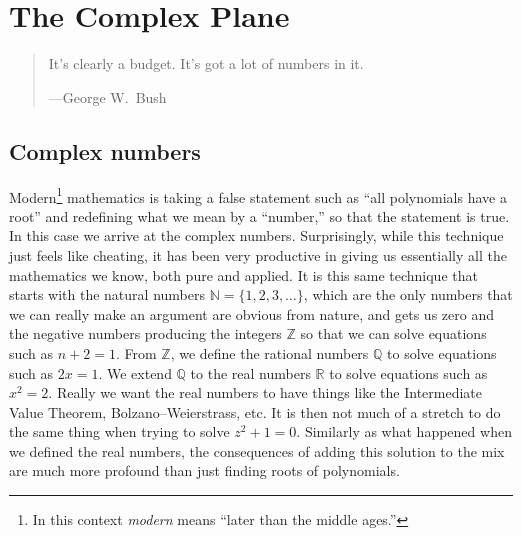 \documentclass[12pt,openany]{book}
\newcommand{\R}{{\mathbb{R}}}
\newcommand{\Z}{{\mathbb{Z}}}
\newcommand{\N}{{\mathbb{N}}}
\newcommand{\Q}{{\mathbb{Q}}}
\theoremstyle{plain}
\theoremstyle{remark}
\theoremstyle{definition}
\newenvironment{myquote}{%
    \begin{quote}%
    \begingroup\itshape
}{%
    \endgroup%
    \end{quote}
}
\theoremstyle{exercise}
\theoremstyle{example}
\begin{document}

\chapter{The Complex Plane} \label{ch:complexplane}

\begin{myquote}
It's clearly a budget. It's got a lot of numbers in it.

---George W.\ Bush
\end{myquote}


\section{Complex numbers} \label{sec:complexnums}


Modern\footnote{In this context \emph{modern}
means ``later than the middle ages.''}
mathematics
is taking a false statement such as ``all
polynomials have a root'' and redefining what we mean by a ``number,''
so that the statement is true.  In this case we arrive at the complex
numbers.  Surprisingly, while this technique
just feels like cheating, it has been very productive in giving us
essentially all the mathematics we know, both pure and applied.  It is this same
technique that starts with the natural numbers
$\N = \{ 1,2,3,\ldots \}$, which are the only
numbers that we can really make an argument are obvious from nature,
and gets us zero and the negative numbers producing the integers
$\Z$ so that we can solve equations such as $n+2 = 1$.
From $\Z$, we define the rational numbers
$\Q$ to solve equations such as $2x=1$.  We extend
$\Q$ to the real numbers $\R$
to solve equations such as $x^2=2$.  Really we want the real numbers to
have things like the Intermediate Value Theorem, Bolzano--Weierstrass,
etc.  It is then not much of a stretch to do the same thing when trying
to solve $z^2+1=0$.  Similarly as what happened when we defined the real
numbers, the consequences of adding this solution to the mix are much more
profound than just finding roots of polynomials.
\end{document}
